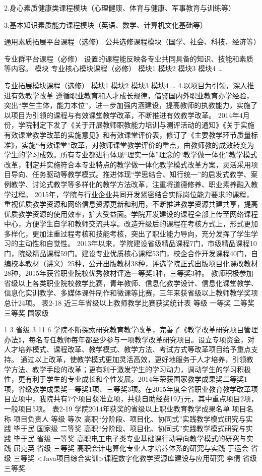 2.身心素质健康类课程模块（心理健康、体育与健康、军事教育与训练等）


3.基本知识素质能力课程模块（英语、数学、计算机文化基础等）

通用素质拓展平台课程（选修）
公共选修课程模块（国学、社会、科技、经济等）

专业群平台课程（必修）
设置的课程能反映各专业共同具备的知识、技能和素质等内容。
模块
专业核心模块课程（必修）
模块1
模块2
模块3
模块4
…

专业拓展模块课程（选修）
模块1
模块2
模块3
模块4
…
4.以项目为引领，深入推进有效教学改革
遵循职业教育和人才成长规律，借鉴国内外职业教育办学经验，突出“学生主体，能力本位”，进一步加强内涵建设，提高教师的执教能力，实施了以项目为引领的课程与有效课堂教学改革，不断推进有效教学改革。
2014年4月份，学院制定下发了《关于开展教师职教能力培训与测评活动的通知》《关于实施有效课堂教学改革的实施意见》和有效课堂评价表，修订了《主要教学环节质量标准》，实施“有效课堂”改革，对教师课堂教学评价的重点，由教师教的成效转变为学生的学习成效。所有专业都进行体现“理实一体”理念的“教学做一体化”教学模式改革，制定并实施符合本专业特点的教学做一体化教学模式改革方案，灵活采用项目导向、任务驱动等教学模式。推进体现“学思结合、知行统一”的启发式教学、案例教学、讨论式教学等多样化的教学方法改革，注重将道德修养、职业素养融入教学过程。
2015年，学院与行业企业共同开发紧密结合实际岗位能力要求的课程，重视优质教学资源和网络信息资源更新和利用，不断推进教学资源共建共享，提高优质教学资源的使用效率，扩大受益面。学院开发建设的课程全部上传至网络课程中心，方便学生自学和教师交流共享。改造升级后的课程在考核方式上，形式更加多样化，更加注重过程考核和技能考核，突出了职业能力导向，充分发挥了学生学习的主动性和自觉性。
2013年以来，学院建设省级精品课程7门，市级精品课程10门，院级精品课程59门。建设专业优质核心课程53门，校企合作开发课程40门，自编校本教材（讲义）25种，公开出版教材38种，评选学院正式出版项目化课改教材28种，2015年获省职业院校优秀教材评选一等奖1种，三等奖3种。
教师积极参加省级以上各类职业院校教学比赛，青年教师、信息化教学设计、信息化课堂教学、信息化实训教学、多媒体课件制作和微课等比赛，三年来获省级以上教师教学奖项总计24项。
表2-18 近三年省级以上教师教学比赛获奖统计表
等级
一等奖
二等奖
三等奖
国家级

1
3
省级
3
11
6
学院不断探索研究教育教学改革，完善了《教学改革研究项目管理办法》，每名专任教师每年都至少参与一项教学改革研究项目。设立专项资金，对人才培养模式、课程改革、教学模式、教学方法、考试方式等改革项目给予重点支持。
通过以上改革，使教学模式更加灵活高效，更好地服务于人才培养，引领教学方法、教学手段的改革；更有利于激发学生的学习动力，调动学生的学习积极性，更有利于学生的专业成长和个性发展。2014年荣获国家教学成果奖二等奖1项，省级教学成果奖一等奖1项、三等奖3项。在2015年度全省职业教育教学改革项目立项中，我院共有7个项目获准立项，共获自助经费19万元，其中重点项目2项，一般项目5项。
表2-19  学院2014年获奖的省级以上职业教育教学成果名单
项目名称
项目负责人
等级
等次
高职“分阶段、项目化、协同式”实践教学模式研究与实践
毕于民
国家级
二等奖
高职“分阶段、项目化、协同式”实践教学模式研究与实践
毕于民
省级
一等奖
高职电工电子类专业基础课行动导向教学模式的研究与实践
屈克英
省级
三等奖
高职会计电算化专业人才培养体系的研究与实践
于运会
省级
三等奖
<Java项目综合实训>课程数字化教学资源库建设与应用研究
李倩
省级
三等奖


